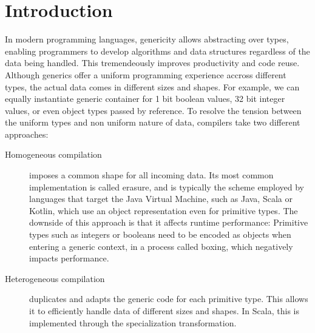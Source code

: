 \section{Introduction}
\label{sec:intro}


In modern programming languages, genericity allows abstracting over types, enabling programmers to develop algorithms and data structures regardless of the data being handled. This tremendeously improves productivity and code reuse. Although generics offer a uniform programming experience accross different types, the actual data comes in different sizes and shapes. For example, we can equally instantiate generic container for 1 bit boolean values, 32 bit integer values, or even object types passed by reference. To resolve the tension between the uniform types and non uniform nature of data, compilers take two different approaches:

\begin{description}
  \item[Homogeneous compilation] imposes a common shape for all incoming data. Its most common implementation is called erasure, and is typically the scheme employed by languages that target the Java Virtual Machine, such as Java, Scala or Kotlin, which use an object representation even for primitive types. The downside of this approach is that it affects runtime performance: Primitive types such as integers or booleans need to be encoded as objects when entering a generic context, in a process called boxing, which negatively impacts performance.
  \item[Heterogeneous compilation] duplicates and adapts the generic code for each primitive type. This allows it to efficiently handle data of different sizes and shapes. In Scala, this is implemented through the specialization transformation. 
\end{description} 

